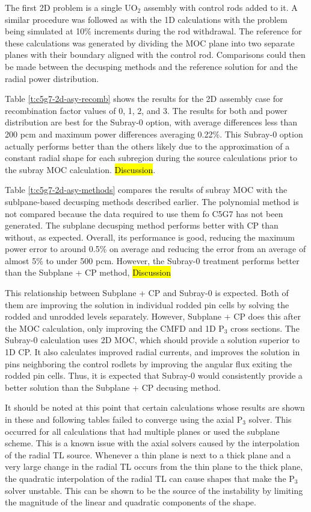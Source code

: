 The first 2D problem is a single UO$_2$ assembly with control rods added to it.  A similar procedure was followed as with the 1D calculations with the problem being simulated at 10\% increments during the rod withdrawal.  The reference for these calculations was generated by dividing the MOC plane into two separate planes with their boundary aligned with the control rod.  Comparisons could then be made between the decusping methods and the reference solution for \keff{} and the radial power distribution.

Table \ref{t:c5g7-2d-asy-recomb} shows the results for the 2D assembly case for recombination factor values of 0, 1, 2, and 3.  The results for both \keff{} and power distribution are best for the Subray-0 option, with average \keff{} differences less than 200 pcm and maximum power differences averaging 0.22\%.  This Subray-0 option actually performs better than the others likely due to the approximation of a constant radial shape for each subregion during the source calculations prior to the subray MOC calculation.  \hl{Discussion}.

Table \ref{t:c5g7-2d-asy-methods} compares the results of subray MOC with the sublpane-based decusping methods described earlier.  The polynomial method is not compared because the data required to use them fo C5G7 has not been generated.  The subplane decusping method performs better with CP than without, as expected.  Overall, its performance is good, reducing the maximum power error to around 0.5\% on average and reducing the \keff{} error from an average of almost 5\% to under 500 pcm.  However, the Subray-0 treatment performs better than the Subplane + CP method, \hl{Discussion}

This relationship between Subplane + CP and Subray-0 is expected.  Both of them are improving the solution in individual rodded pin cells by solving the rodded and unrodded levels separately.  However, Subplane + CP does this after the MOC calculation, only improving the CMFD and 1D P$_3$ cross sections.  The Subray-0 calculation uses 2D MOC, which should provide a solution superior to 1D CP.  It also calculates improved radial currents, and improves the solution in pins neighboring the control rodlets by improving the angular flux exiting the rodded pin cells.  Thus, it is expected that Subray-0 would consistently provide a better solution than the Subplane + CP decusing method.

It should be noted at this point that certain calculations whose results are shown in these and following tables failed to converge using the axial P$_3$ solver.  This occurred for all calculations that had multiple planes or used the subplane scheme.  This is a known issue with the axial solvers caused by the interpolation of the radial TL source.  Whenever a thin plane is next to a thick plane and a very large change in the radial TL occurs from the thin plane to the thick plane, the quadratic interpolation of the radial TL can cause shapes that make the P$_3$ solver unstable.  This can be shown to be the source of the instability by limiting the magnitude of the linear and quadratic components of the shape.

